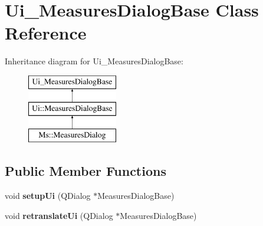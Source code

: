 \hypertarget{class_ui___measures_dialog_base}{}\section{Ui\+\_\+\+Measures\+Dialog\+Base Class Reference}
\label{class_ui___measures_dialog_base}
Inheritance diagram for Ui\+\_\+\+Measures\+Dialog\+Base\+:\begin{figure}[H]
\begin{center}
\leavevmode
\includegraphics[height=3.000000cm]{class_ui___measures_dialog_base}
\end{center}
\end{figure}
\subsection*{Public Member Functions}
\begin{DoxyCompactItemize}
\item 
\mbox{\label{class_ui___measures_dialog_base_a4e657fd6dee4c6413207471cd6d47af3}} 
void {\bfseries setup\+Ui} (Q\+Dialog $\ast$Measures\+Dialog\+Base)
\item 
\mbox{\label{class_ui___measures_dialog_base_a49c0690ce3f33c7a761e4dcc6a0ab17b}} 
void {\bfseries retranslate\+Ui} (Q\+Dialog $\ast$Measures\+Dialog\+Base)
\end{DoxyCompactItemize}
